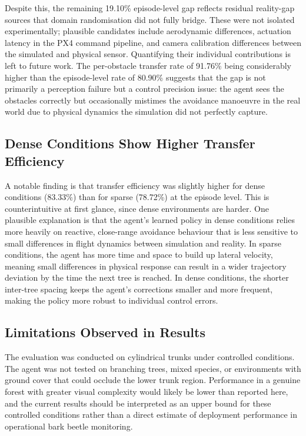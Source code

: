 \documentclass[../main.tex]{subfiles}
\begin{document}
Despite this, the remaining 19.10\% episode-level gap reflects residual reality-gap sources that domain randomisation did not fully bridge. These were not isolated experimentally; plausible candidates include aerodynamic differences, actuation latency in the PX4 command pipeline, and camera calibration differences between the simulated and physical sensor. Quantifying their individual contributions is left to future work. The per-obstacle transfer rate of 91.76\% being considerably higher than the episode-level rate of 80.90\% suggests that the gap is not primarily a perception failure but a control precision issue: the agent sees the obstacles correctly but occasionally mistimes the avoidance manoeuvre in the real world due to physical dynamics the simulation did not perfectly capture.

\subsection{Dense Conditions Show Higher Transfer Efficiency}

A notable finding is that transfer efficiency was slightly higher for dense conditions (83.33\%) than for sparse (78.72\%) at the episode level. This is counterintuitive at first glance, since dense environments are harder. One plausible explanation is that the agent's learned policy in dense conditions relies more heavily on reactive, close-range avoidance behaviour that is less sensitive to small differences in flight dynamics between simulation and reality. In sparse conditions, the agent has more time and space to build up lateral velocity, meaning small differences in physical response can result in a wider trajectory deviation by the time the next tree is reached. In dense conditions, the shorter inter-tree spacing keeps the agent's corrections smaller and more frequent, making the policy more robust to individual control errors.

\subsection{Limitations Observed in Results}

The evaluation was conducted on cylindrical trunks under controlled conditions. The agent was not tested on branching trees, mixed species, or environments with ground cover that could occlude the lower trunk region. Performance in a genuine forest with greater visual complexity would likely be lower than reported here, and the current results should be interpreted as an upper bound for these controlled conditions rather than a direct estimate of deployment performance in operational bark beetle monitoring.
\end{document}
